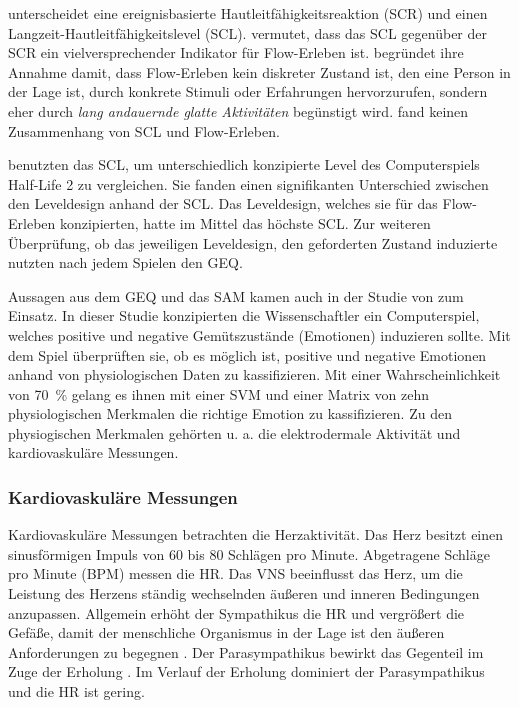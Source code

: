 \citet{Kilpatrick1972} unterscheidet eine ereignisbasierte Hautleitfähigkeitsreaktion (\ac{SCR}) und einen Langzeit-Hautleitfähigkeitslevel (\ac{SCL}). \citet[][S.~158]{Peifer2012} vermutet, dass das \ac{SCL} gegenüber der \ac{SCR} ein vielversprechender Indikator für Flow-Erleben ist. \citet[][S.~158]{Peifer2012} begründet ihre Annahme damit, dass Flow-Erleben kein diskreter Zustand ist, den eine Person in der Lage ist, durch konkrete Stimuli oder Erfahrungen hervorzurufen, sondern eher durch \emph{lang andauernde glatte Aktivitäten} begünstigt wird. \citet{Kilpatrick1972} fand keinen Zusammenhang von \ac{SCL} und Flow-Erleben. 

\citet{Nacke2008} benutzten das \ac{SCL}, um unterschiedlich konzipierte Level des Computerspiels Half-Life 2 zu vergleichen. Sie fanden einen signifikanten Unterschied zwischen den Leveldesign anhand der \ac{SCL}. Das Leveldesign, welches sie für das Flow-Erleben konzipierten, hatte im Mittel das höchste \ac{SCL}. Zur weiteren Überprüfung, ob das jeweiligen Leveldesign, den geforderten Zustand induzierte nutzten \citet{Nacke2008} nach jedem Spielen den \ac{GEQ}.

Aussagen aus dem \ac{GEQ} und das \ac{SAM} kamen auch in der Studie von \citet{Friedrichs2015} zum Einsatz. In dieser Studie konzipierten die Wissenschaftler ein Computerspiel, welches positive und negative Gemütszustände (Emotionen) induzieren sollte. Mit dem Spiel überprüften sie, ob es möglich ist, positive und negative Emotionen anhand von physiologischen Daten zu kassifizieren. Mit einer Wahrscheinlichkeit von 70~\% gelang es ihnen mit einer \ac{SVM} und einer Matrix von zehn physiologischen Merkmalen die richtige Emotion zu kassifizieren. Zu den physiogischen Merkmalen gehörten u. a. die elektrodermale Aktivität und kardiovaskuläre Messungen.

\subsubsection{Kardiovaskuläre Messungen} 

\label{ssub:kardiovaskulare_messungen}

Kardiovaskuläre Messungen betrachten die Herzaktivität. Das Herz besitzt einen sinusförmigen Impuls von 60 bis 80 Schlägen pro Minute. Abgetragene Schläge pro Minute (\ac{BPM}) messen die \ac{HR}. Das \ac{VNS} beeinflusst das Herz, um die Leistung des Herzens ständig wechselnden äußeren und inneren Bedingungen anzupassen. Allgemein erhöht der Sympathikus die \ac{HR} und vergrößert die Gefäße, damit der menschliche Organismus in der Lage ist den äußeren Anforderungen zu begegnen \citep[][S.~226]{Porges1995}. Der Parasympathikus bewirkt das Gegenteil im Zuge der Erholung \citep[][S.~226]{Porges1995}. Im Verlauf der Erholung dominiert der Parasympathikus und die \ac{HR} ist gering. 

